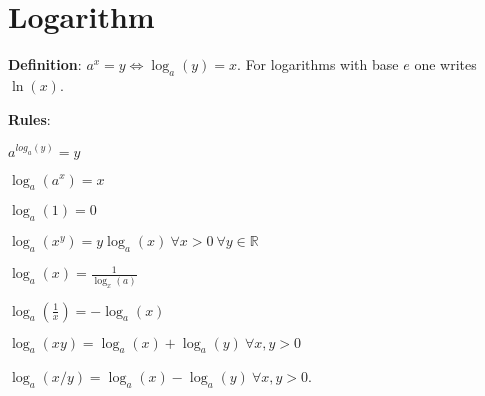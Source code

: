 \section{Logarithm}
{\bf Definition}: $a^x=y\Leftrightarrow\log_a(y)=x $. For logarithms with
base $e$ one writes $\ln(x)$.

{\bf Rules}:
	
	$a^{log_a(y)}=y $
	
	$\log_a(a^x)=x$
	
	$\log_a(1)=0$
	
	$\log_a(x^y)=y\log_a(x) \ \forall x>0 \ \forall y \in \mathbb{R}$
	
	$\log_a(x)=\frac{1}{\log_x(a)}$
	
	$\log_a(\frac{1}{x})=-\log_a(x)$
	
	$\log_a(xy) = \log_a(x)+\log_a(y) \  \forall x,y>0$
	
	$\log_a(x/y) = \log_a(x)-\log_a(y) \ \forall x,y>0$.
